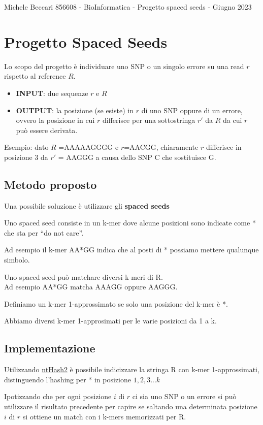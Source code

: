 \documentclass{article}
\begin{document}
	{Michele Beccari 856608 - BioInformatica -  Progetto spaced seeds - Giugno 2023} 
	
	\section{Progetto Spaced Seeds}

Lo scopo del progetto è individuare uno SNP o un singolo errore su una read $r$ rispetto al reference $R$.

\begin{itemize}
	\item \textbf{INPUT}: due sequenze $r$ e $R$
	\item \textbf{OUTPUT}: la posizione (se esiste) in $r$ di uno SNP oppure di un errore, ovvero la posizione in cui $r$ differisce per una sottostringa $r'$ da $R$ da cui $r$ può essere derivata. 
\end{itemize}

\begin{mdframed}[hidealllines=true,backgroundcolor=blue!20]
Esempio: dato $R$ =AAAAAGGGG e $r$=AACGG, chiaramente $r$ differisce in posizione 3 da $r'$ = AAGGG a causa dello SNP C che sostituisce G.
\end{mdframed} 

\subsection{Metodo proposto}
Una possibile soluzione è utilizzare gli \textbf{spaced seeds}

\begin{mdframed}[hidealllines=true,backgroundcolor=blue!20]
Uno spaced seed consiste in un k-mer dove alcune posizioni sono indicate come * che sta per “do not care”.
\end{mdframed} 

Ad esempio il k-mer AA*GG indica che al posti di * possiamo mettere qualunque simbolo.

Uno spaced seed può matchare diversi k-meri di R. \\
Ad esempio AA*GG matcha AAAGG oppure AAGGG.

\begin{mdframed}[hidealllines=true,backgroundcolor=blue!20]
Definiamo un k-mer 1-approssimato se solo una posizione del k-mer è *.
\end{mdframed}

Abbiamo diversi k-mer 1-approsimati per le varie posizioni da 1 a k.


\subsection{Implementazione}

Utilizzando  \href{https://github.com/bcgsc/ntHash}{ntHash2} è possibile indicizzare la stringa R con k-mer 1-approssimati, distinguendo l'hashing per * in posizione $1,2,3...k$


Ipotizzando che per ogni posizione $i$ di $r$ ci sia uno SNP o un errore si può utilizzare il risultato precedente per capire se saltando una determinata posizione $i$ di $r$ si ottiene un match con i k-mers memorizzati per R.
\end{document}
